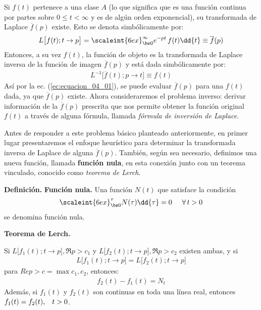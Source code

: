 Si $f (t)$ pertenece a una clase $A$ (lo que significa que es una función continua por partes sobre $0 \leq t < \infty$ y es de algún orden exponencial), su transformada de Laplace $\overline{f} (p)$ existe. Esto se denota simbólicamente por:
\begin{align}
L \big[f(t); t \to p\big] = \scaleint{6ex}_{\bs 0}^{\infty} e^{-p t} \, f(t) \dd{t} \equiv \overline{f} (p)
\label{ec:ecuacion_04_01}
\end{align}
Entonces, a su vez $f (t)$, la función de objeto es la transformada de Laplace inversa de la función de imagen $\overline{f} (p)$ y está dada simbólicamente por:
\begin{align}
L^{-1} \big[\overline{f}(t); p \to t\big] \equiv f (t)
\label{ec:ecuacion_04_02}
\end{align}
Así por la ec. (\ref{ec:ecuacion_04_01}), se puede evaluar $\overline{f} (p)$ para una $f (t)$ dada, ya que $\overline{f} (p)$ existe. Ahora consideraremos el problema inverso: derivar información de la $\overline{f} (p)$ prescrita que nos permite obtener la función original $f (t)$ a través de alguna fórmula, llamada \emph{fórmula de inversión de Laplace}.
\par
Antes de responder a este problema básico planteado anteriormente, en primer lugar presentaremos el enfoque heurístico para determinar la transformada inversa de Laplace de alguna $\overline{f}(p)$. También, según sea necesario, definimos una nueva función, llamada \textbf{función nula}, en esta conexión junto con un teorema vinculado, conocido como \emph{teorema de Lerch}.
\par
\noindent \textbf{Definición.} \textbf{Función nula.} Una función $N (t)$ que satisface la condición
\begin{align*}
\scaleint{6ex}_{\bs 0}^{\tau} N(\tau) \dd{\tau} = 0 \hspace{0.5cm} \forall \, t > 0
\end{align*}
se denomina función nula.
\par
\noindent \textbf{Teorema de Lerch.}

\noindent Si $L \big[f_{1} (t); t \to p\big], \Re {p} > c_{1}$ y $L \big[f_{2} (t); t \to p\big], \Re {p} > c_{2}$ existen ambas, y si
\begin{align*}
L \big[f_{1} (t); t \to p\big] = L \big[f_{2} (t); t \to p\big]
\end{align*}
para $Re{p} > c = \max{c_{1},c_{2}}$, entonces:
\begin{align*}
f_{2} (t) - f_{1} (t) = N_{t}
\end{align*}
Además, si $f_{1}(t)$ y $f_{2}(t)$ son continuas en toda una línea real, entonces $f_{1}(t) = f_{2}(t), \hspace{0.3cm} t > 0$.
